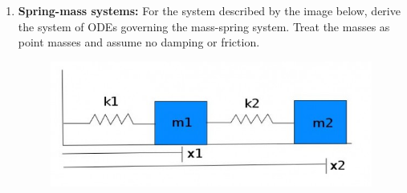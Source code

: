 \documentclass[letterpaper, fontsize=12pt]{scrartcl} %
\numberwithin{equation}{section} %
\numberwithin{figure}{section} %
\numberwithin{table}{section} %
\begin{document}
\begin{enumerate}
\begin{enumerate}[label=(\alph*)]
\end{enumerate}




\item \textbf{Spring-mass systems:} For the system described by the image below, derive the system of ODEs governing the mass-spring system. Treat the masses as point masses and assume no damping or friction.
\begin{figure}[H]
\centering \includegraphics[width=0.8\columnwidth]{mass-spring.jpg}
\end{figure}


\end{enumerate}
\end{document}
